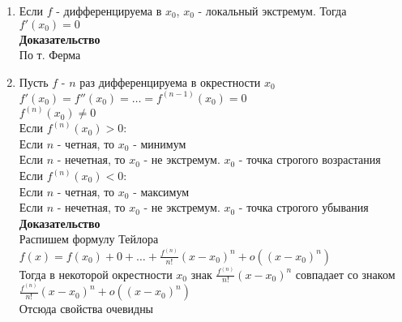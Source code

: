 \documentclass[12pt]{article}
\begin{document}
\begin{enumerate}
    \item Если $f$ - дифференцируема в $x_0$, $x_0$ - локальный экстремум. Тогда $f'(x_0) = 0$\\
    \textbf{Доказательство}\\
    По т. Ферма
    \item Пусть $f$ - $n$ раз дифференцируема в окрестности $x_0$\\
    $f'(x_0) = f''(x_0) = \ldots = f^{(n-1)}(x_0) = 0$\\
    $f^{(n)}(x_0) \neq 0$\\
    Если $f^{(n)}(x_0) > 0$:\\
    Если $n$ - четная, то $x_0$ - минимум\\
    Если $n$ - нечетная, то $x_0$ - не экстремум. $x_0$ - точка строгого возрастания\\
    Если $f^{(n)}(x_0) < 0$:\\
    Если $n$ - четная, то $x_0$ - максимум\\
    Если $n$ - нечетная, то $x_0$ - не экстремум. $x_0$ - точка строгого убывания\\
    \textbf{Доказательство}\\
    Распишем формулу Тейлора\\
    $f(x) = f(x_0) + 0 + \ldots + \frac{f^{(n)}}{n!}(x-x_0)^n + o((x-x_0)^n)$\\
    Тогда в некоторой окрестности $x_0$ знак $\frac{f^{(n)}}{n!}(x-x_0)^n$ совпадает со знаком $\frac{f^{(n)}}{n!}(x-x_0)^n + o((x-x_0)^n)$\\
    Отсюда свойства очевидны
\end{enumerate}
\end{document}
